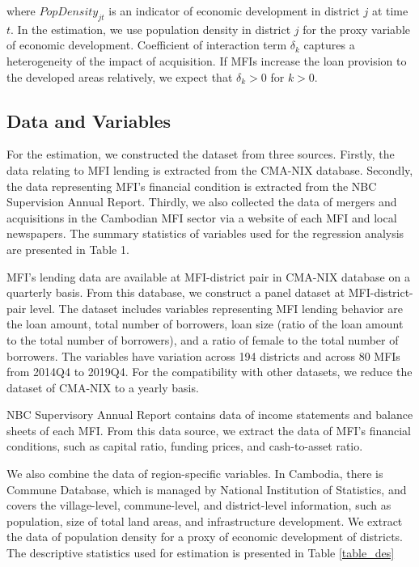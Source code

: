 \documentclass[a4j,12pt]{article}
\begin{document}
where $PopDensity_{jt}$ is an indicator of economic development in district $j$ at time $t$. In the estimation, we use population density in district $j$ for the proxy variable of economic development. Coefficient of interaction term $\delta_{k}$ captures a heterogeneity of the impact of acquisition. If MFIs increase the loan provision to the developed areas relatively, we expect that $\delta_{k}>0$ for $k>0$. 


\subsection{Data and Variables}
For the estimation, we constructed the dataset from three sources. Firstly, the data relating to MFI lending is extracted from the CMA-NIX database. Secondly, the data representing MFI's financial condition is extracted from the NBC Supervision Annual Report. Thirdly, we also collected the data of mergers and acquisitions in the Cambodian MFI sector via a website of each MFI and local newspapers. The summary statistics of variables used for the regression analysis are presented in Table 1. 

MFI's lending data are available at MFI-district pair in CMA-NIX database on a quarterly basis. From this database, we construct a panel dataset at MFI-district-pair level. The dataset includes variables representing MFI lending behavior are the loan amount, total number of borrowers, loan size (ratio of the loan amount to the total number of borrowers), and a ratio of female to the total number of borrowers. The variables have variation across 194 districts and across 80 MFIs from 2014Q4 to 2019Q4. For the compatibility with other datasets, we reduce the dataset of CMA-NIX to a yearly basis.  

NBC Supervisory Annual Report contains data of income statements and balance sheets of each MFI. From this data source, we extract the data of MFI's financial conditions, such as capital ratio, funding prices, and cash-to-asset ratio.  

We also combine the data of region-specific variables. In Cambodia, there is Commune Database, which is managed by National Institution of Statistics, and covers the village-level, commune-level, and district-level information, such as population, size of total land areas, and infrastructure development. We extract the data of population density for a proxy of economic development of districts. The descriptive statistics used for estimation is presented in Table \ref{table_des}
\end{document}
